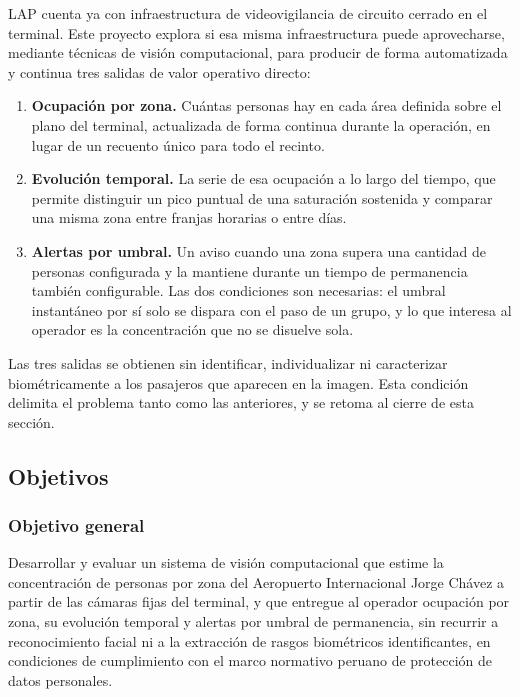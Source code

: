 LAP cuenta ya con infraestructura de videovigilancia de circuito cerrado
en el terminal. Este proyecto explora si esa misma infraestructura puede
aprovecharse, mediante técnicas de visión computacional, para producir
de forma automatizada y continua tres salidas de valor operativo
directo:

\begin{enumerate}[leftmargin=1.6em,itemsep=0.35em]
  \item \textbf{Ocupación por zona.} Cuántas personas hay en cada área
        definida sobre el plano del terminal, actualizada de forma
        continua durante la operación, en lugar de un recuento único
        para todo el recinto.
  \item \textbf{Evolución temporal.} La serie de esa ocupación a lo
        largo del tiempo, que permite distinguir un pico puntual de una
        saturación sostenida y comparar una misma zona entre franjas
        horarias o entre días.
  \item \textbf{Alertas por umbral.} Un aviso cuando una zona supera una
        cantidad de personas configurada y la mantiene durante un tiempo
        de permanencia también configurable. Las dos condiciones son
        necesarias: el umbral instantáneo por sí solo se dispara con el
        paso de un grupo, y lo que interesa al operador es la
        concentración que no se disuelve sola.
\end{enumerate}

Las tres salidas se obtienen sin identificar, individualizar ni
caracterizar biométricamente a los pasajeros que aparecen en la imagen.
Esta condición delimita el problema tanto como las anteriores, y se
retoma al cierre de esta sección.

\subsection{Objetivos}
\label{sec:objetivos}

\subsubsection*{Objetivo general}

Desarrollar y evaluar un sistema de visión computacional que estime la
concentración de personas por zona del Aeropuerto Internacional Jorge
Chávez a partir de las cámaras fijas del terminal, y que entregue al
operador ocupación por zona, su evolución temporal y alertas por umbral
de permanencia, sin recurrir a reconocimiento facial ni a la extracción
de rasgos biométricos identificantes, en condiciones de cumplimiento con
el marco normativo peruano de protección de datos personales.

